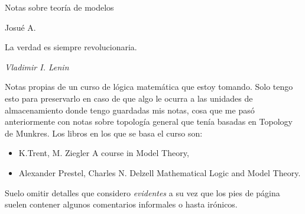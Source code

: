 \begin{titlepage}
    \centering
    \vspace*{\fill}
    \vspace*{0.5cm}

    \Huge
    Notas sobre teor\'ia de modelos

    \vspace*{0.5cm}

    \large Josu\'e A.

    \vspace*{\fill}
\end{titlepage}
\newpage
\large
\epigraph{La verdad es siempre revolucionaria.}{\textit{Vladimir I. Lenin}}
\normalsize
Notas propias de un curso de l\'ogica matem\'atica que estoy tomando.
Solo tengo esto para preservarlo en caso de que algo le ocurra a las unidades de almacenamiento donde tengo guardadas mis notas, cosa que me pas\'o anteriormente con notas sobre topolog\'ia general que ten\'ia basadas en Topology de Munkres. \hfill \break
Los libros en los que se basa el curso son:
\begin{itemize}
\item
  K.Trent, M. Ziegler A course in Model Theory, 
\item
  Alexander Prestel, Charles N. Delzell Mathematical Logic and Model Theory.
\end{itemize}
Suelo omitir detalles que considero \emph{evidentes} a su vez que los pies de p\'agina suelen contener algunos comentarios informales o hasta ir\'onicos.
\tableofcontents
\newpage
